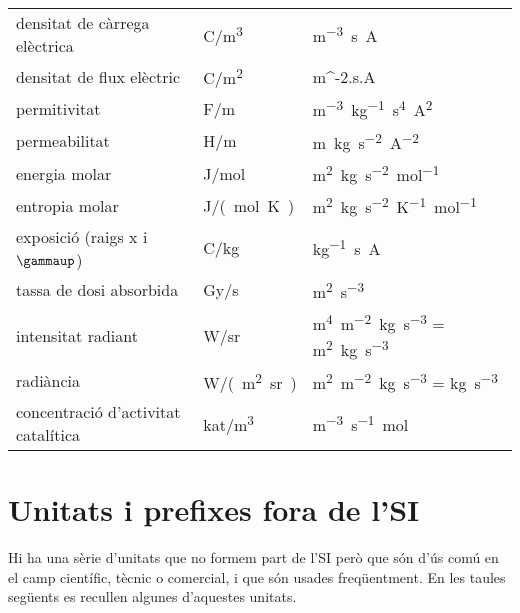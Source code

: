 \begin{longtable}[h]{lll}
   densitat de càrrega elèctrica & \si{C/m^3} & \si{m^{-3}.s.A} \\
   densitat de flux elèctric & \si{C/m^2} & \si{m^{-2}.s.A }\\
   permitivitat &  \si{F/m}& \si{m^{-3}.kg^{-1}.s^4.A^2} \\
   permeabilitat &  \si{H/m} & \si{m.kg.s^{-2}.A^{-2}} \\
   energia molar & \si{J/mol} & \si{m^2.kg.s^{-2}.mol^{-1}} \\
   entropia molar& \si{J/(mol.K)} & \si{m^2.kg.s^{-2}.K^{-1}.mol^{-1}} \\
   exposició (raigs x i $\gammaup$) & \si{C/kg} & \si{kg^{-1}.s.A} \\
   tassa de dosi absorbida & \si{Gy/s} & \si{m^2.s^{-3}}\\
   intensitat radiant & \si{W/sr} & \si{m^4.m^{-2}.kg.s^{-3}} = \si{m^2.kg.s^{-3}} \\
   radiància & \si{W/(m^2.sr)} & \si{m^2.m^{-2}.kg.s^{-3}} = \si{kg.s^{-3}} \\
   concentració d'activitat catalítica &  \si{kat/m^3} & \si{m^{-3}.s^{-1}.mol}\\
    \bottomrule[1pt]
\end{longtable}



\section{Unitats i prefixes fora de l'SI}

Hi ha una sèrie d'unitats que no formem part de l'SI però que són d'ús comú en el camp científic, tècnic o comercial, i que són usades freqüentment. En les taules següents es recullen algunes d'aquestes unitats.


